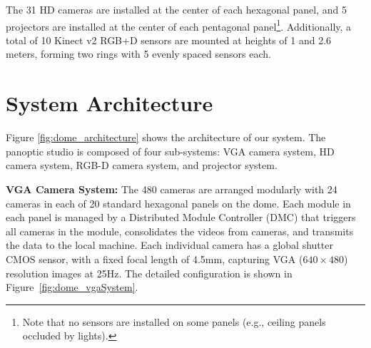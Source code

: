 The 31 HD cameras are installed at the center of each hexagonal panel, and 5 projectors are installed at the center of each pentagonal panel\footnote{Note that no sensors are installed on some panels (e.g., ceiling panels occluded by lights).}. Additionally, a total of 10 Kinect v2 RGB+D sensors are mounted at heights of 1 and 2.6 meters, forming two rings with 5 evenly spaced sensors each. %


	
\section{System Architecture}
Figure \ref{fig:dome_architecture} shows the architecture of our system. The panoptic studio is composed of four sub-systems: VGA camera system, HD camera system, RGB-D camera system, and projector system.

\noindent \textbf{VGA Camera System:} The 480 cameras are arranged modularly with 24 cameras in each of 20 standard hexagonal panels on the dome. Each module in each panel is managed by a Distributed Module Controller (DMC) that triggers all cameras in the module, consolidates the videos from cameras, and transmits the data to the local machine. Each individual camera has a global shutter CMOS sensor, with a fixed focal length of 4.5mm, capturing VGA ($640\times480$) resolution images at 25Hz. The detailed configuration is shown in Figure~\ref{fig:dome_vgaSystem}. 

